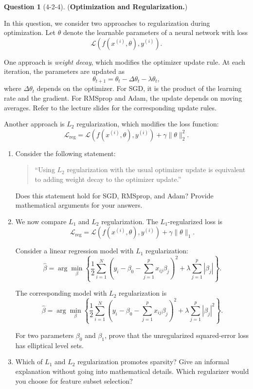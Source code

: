 \documentclass[12pt]{article}
\newif\ifexercise
\theoremstyle{definition}
\newtheorem{exercise}{Question}%
\newcommand{\Exercise}[1]{
\ifexercise#1\fi
}
\newif\ifexercise
\begin{document}
\begin{exercise}[4-2-4] (\textbf{Optimization and Regularization.})
\Exercise{\label{ex:optimization-regularization}}

In this question, we consider two approaches to regularization during
optimization. Let $\theta$ denote the learnable parameters of a neural network
with loss
\[
\mathcal{L}(f(x^{(i)},\theta),y^{(i)}).
\]

One approach is \textit{weight decay}, which modifies the optimizer update
rule. At each iteration, the parameters are updated as
\[
\theta_{t+1}
=
\theta_t-\Delta\theta_t-\lambda\theta_t,
\]
where $\Delta\theta_t$ depends on the optimizer. For SGD, it is the product of
the learning rate and the gradient. For RMSprop and Adam, the update depends on
moving averages. Refer to the lecture slides for the corresponding update
rules.

Another approach is $L_2$ regularization, which modifies the loss function:
\[
\mathcal{L}_{\mathrm{reg}}
=
\mathcal{L}(f(x^{(i)},\theta),y^{(i)})
+
\gamma\|\theta\|_2^2.
\]

\begin{enumerate}

    \item Consider the following statement:
    \begin{quote}
    ``Using $L_2$ regularization with the usual optimizer update is equivalent
    to adding weight decay to the optimizer update.''
    \end{quote}

    Does this statement hold for SGD, RMSprop, and Adam? Provide mathematical
    arguments for your answers.

    \item We now compare $L_1$ and $L_2$ regularization. The $L_1$-regularized
    loss is
    \[
    \mathcal{L}_{\mathrm{reg}}
    =
    \mathcal{L}(f(x^{(i)},\theta),y^{(i)})
    +
    \gamma\|\theta\|_1.
    \]

    Consider a linear regression model with $L_1$ regularization:
    \[
    \hat{\beta}
    =
    \arg\min_{\beta}
    \left\{
    \frac{1}{2}
    \sum_{i=1}^{N}
    \left(
    y_i-\beta_0-\sum_{j=1}^{p}x_{ij}\beta_j
    \right)^2
    +
    \lambda\sum_{j=1}^{p}|\beta_j|
    \right\}.
    \]

    The corresponding model with $L_2$ regularization is
    \[
    \hat{\beta}
    =
    \arg\min_{\beta}
    \left\{
    \frac{1}{2}
    \sum_{i=1}^{N}
    \left(
    y_i-\beta_0-\sum_{j=1}^{p}x_{ij}\beta_j
    \right)^2
    +
    \lambda\sum_{j=1}^{p}|\beta_j|^2
    \right\}.
    \]

    For two parameters $\beta_0$ and $\beta_1$, prove that the unregularized
    squared-error loss has elliptical level sets.

    \item Which of $L_1$ and $L_2$ regularization promotes sparsity? Give an
    informal explanation without going into mathematical details. Which
    regularizer would you choose for feature subset selection?

\end{enumerate}
\end{exercise}
\end{document}
